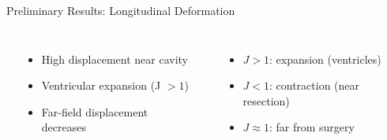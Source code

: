 \begin{frame}{Preliminary Results: Longitudinal Deformation}

  \begin{columns}[T]
    \begin{center}
    \end{center}

    \bigskip

    \begin{itemize}
      \item High displacement near cavity
      \item Ventricular expansion (J $> 1$)
      \item Far-field displacement decreases
    \end{itemize}

    \begin{center}
    \end{center}

    \bigskip

    \begin{itemize}
      \item $J > 1$: expansion (ventricles)
      \item $J < 1$: contraction (near resection)
      \item $J \approx 1$: far from surgery
    \end{itemize}
  \end{columns}

\end{frame}

